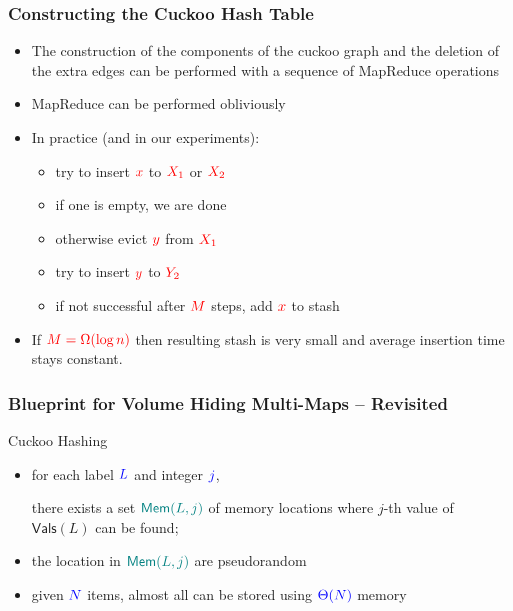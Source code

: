 \documentclass[]{beamer}
\newcommand{\mem}{\mathsf{Mem}}
\newcommand{\vals}{\mathsf{Vals}}
\begin{document}
\begin{frame}
\frametitle{Constructing the Cuckoo Hash Table}

\begin{itemize}[<+->]
\item The construction of the components of the cuckoo graph and the deletion
    of the extra edges can be performed with a sequence of {\color{blue} MapReduce}
operations
\item {\color{blue} MapReduce} can be performed obliviously
\item In practice (and in our experiments):
    \begin{itemize}
        \item try to insert $\color{red} x$ to $\color{red} X_1$ or $\color{red} X_2$
        \item if one is empty, we are done
        \item otherwise evict $\color{red} y$ from $\color{red} X_1$
        \item try to insert $\color{red} y$ to $\color{red} Y_2$ 
        \item if not successful after $\color{red} M$ steps, add $\color{red} x$ to stash
    \end{itemize}
\item {\color{blue} If $\color{red} M=\Omega(\log n)$ then resulting stash is very small
and average insertion time stays constant.}
\end{itemize}


\end{frame}


\begin{frame}
\frametitle{Blueprint for Volume Hiding Multi-Maps -- Revisited}

\begin{block}{Cuckoo Hashing}
    \begin{itemize}[<+->]
    
    \item for each label $\color{blue} L$ and integer $\color{blue} j$,

        there exists
        a set $\color{teal} \mem(L,j)$
        of 
            memory locations 
       where $j$-th value of $\vals(L)$ can be found;

    \item the location in $\color{teal} \mem(L,j)$ are pseudorandom

    \item given $\color{blue} N$ items, {\color{blue} almost} all can be stored 
            using $\color{blue} \Theta(N)$  memory

    \end{itemize}
\end{block}
\end{frame}
\end{document}
